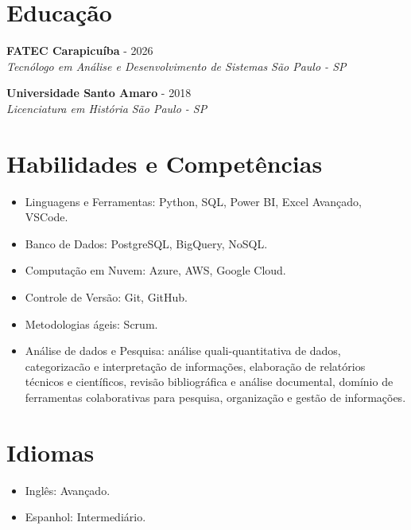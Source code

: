 \documentclass[a4paper,10pt]{article}
\newcommand{\entry}[4]{
  \noindent\textbf{#1} \hfill #2 \\
  \noindent\textit{#3} \hfill \textit{#4} \\
  \vspace{2pt}
}
\begin{document}

\section*{Educação}
\vspace{0.6em}

\entry{FATEC Carapicuíba}{\faCalendar {} - 2026}{Tecnólogo em Análise e Desenvolvimento de Sistemas}{\faMapMarker \space São Paulo - SP}

\entry{Universidade Santo Amaro}{\faCalendar {} - 2018}{Licenciatura em História}{\faMapMarker \space São Paulo - SP}


\section*{Habilidades e Competências}
\vspace{0.6em}
\begin{itemize}
\setlength\itemsep{0em}
\item Linguagens e Ferramentas: Python, SQL, Power BI, Excel Avançado, VSCode.
\item Banco de Dados: PostgreSQL, BigQuery, NoSQL.
\item Computação em Nuvem: Azure, AWS, Google Cloud.
\item Controle de Versão: Git, GitHub.
\item Metodologias ágeis: Scrum.
\item Análise de dados e Pesquisa: análise quali-quantitativa de dados, categorizacão e interpretação de informações, elaboração de relatórios técnicos e científicos, revisão bibliográfica e análise documental, domínio de ferramentas colaborativas para pesquisa, organização e gestão de informações.

\end{itemize}


\section*{Idiomas}
\vspace{0.6em}
\begin{itemize}
\setlength\itemsep{0em}
\item Inglês: Avançado.
\item Espanhol: Intermediário.



\end{itemize}
\end{document}
